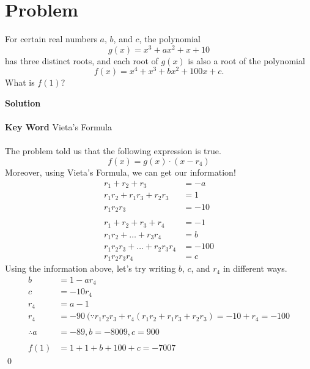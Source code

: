 \documentclass{article}
\newenvironment{solution}{\begin{trivlist}\item[]{\bf Solution}}{\qed \end{trivlist}}
\begin{document}
\section*{Problem}
For certain real numbers $a$, $b$, and $c$, the polynomial
\[
g(x)=x^3+ax^2+x+10
\]
has three distinct roots, and each root of $g(x)$ is also a root of the polynomial
\[
f(x)=x^4+x^3+bx^2+100x+c.
\]
What is $f(1)$?
\begin{solution}
\\\\
\textbf{Key Word} Vieta's Formula
\\\\
The problem told us that the following expression is true.
\[
f(x)=g(x)\cdot(x-r_4)
\]
Moreover, using Vieta's Formula, we can get our information!
\begin{align*}
    r_1+r_2+r_3 &= -a \\
    r_1r_2+r_1r_3+r_2r_3 &= 1 \\
    r_1r_2r_3 &= -10
    \\\\
    r_1+r_2+r_3+r_4 &= -1 \\
    r_1r_2+\dots+r_3r_4 &= b \\
    r_1r_2r_3+\dots+r_2r_3r_4 &= -100 \\
    r_1r_2r_3r_4 &= c
\end{align*}
Using the information above, let's try writing $b$, $c$, and $r_4$ in different ways.
\begin{align*}
    b &= 1-ar_4 \\
    c &= -10r_4 \\
    r_4 &= a-1 \\
    r_4 &= -90\ (\because r_1r_2r_3+r_4(r_1r_2+r_1r_3+r_2r_3)=-10+r_4=-100
    \\\\
    \therefore a&=-89, b=-8009, c=900
    \\\\
    f(1)&=1+1+b+100+c=\boxed{-7007}
\end{align*}
\end{solution}
\end{document}
